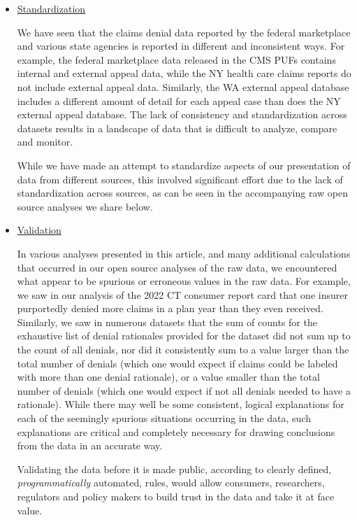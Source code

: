 \documentclass[12pt, a4paper,twoside,parskip=full]{report}
\theoremstyle{plain} %
\theoremstyle{definition} %
\theoremstyle{remark} %
\numberwithin{equation}{chapter}
\begin{document}
		\begin{itemize}
			\item \underline{Standardization}
			
			We have seen that the claims denial data reported by the federal marketplace and various state agencies is reported in different and inconsistent ways. For example, the federal marketplace data released in the CMS PUFs contains internal and external appeal data, while the NY health care claims reports do not include external appeal data. Similarly, the WA external appeal database includes a different amount of detail for each appeal case than does the NY external appeal database. The lack of consistency and standardization across datasets results in a landscape of data that is difficult to analyze, compare and monitor.
			
			While we have made an attempt to standardize aspects of our presentation of data from different sources, this involved significant effort due to the lack of standardization across sources, as can be seen in the accompanying raw open source analyses we share below.
			
			\item \underline{Validation}
			
			In various analyses presented in this article, and many additional calculations that occurred in our open source analyses of the raw data, we encountered what appear to be spurious or erroneous values in the raw data. For example, we saw in our analysis of the 2022 CT consumer report card that one insurer purportedly denied more claims in a plan year than they even received. Similarly, we saw in numerous datasets that the sum of counts for the exhaustive list of denial rationales provided for the dataset did not sum up to the count of all denials, nor did it consistently sum to a value larger than the total number of denials (which one would expect if claims could be labeled with more than one denial rationale), or a value smaller than the total number of denials (which one would expect if not all denials needed to have a rationale). While there may well be some consistent, logical explanations for each of the seemingly spurious situations occurring in the data, such explanations are critical and completely necessary for drawing conclusions from the data in an accurate way.
			
			Validating the data before it is made public, according to clearly defined, \emph{programmatically} automated, rules, would allow consumers, researchers, regulators and policy makers to build trust in the data and take it at face value.
			

\end{itemize}
\end{document}
